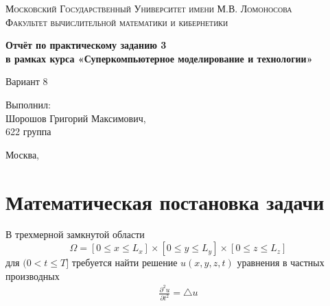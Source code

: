 \documentclass[oneside, final, 12pt]{extarticle}
\begin{document}
\normalsize

\begin{titlepage}
    \begin{center}
        \textsc{Московский Государственный Университет имени М.В. Ломоносова\\[5mm]
            Факультет вычислительной математики и кибернетики}
        \centerline{\hfill\hrulefill\hrulefill\hfill}
    \end{center}

    \vfill
    \vfill
    \vfill
    \vfill
    \begin{center}
        \Large
        \textbf{Отчёт по практическому заданию 3 \\
            в рамках курса
            «Суперкомпьютерное моделирование и технологии»}
    \end{center}

    \vfill
    \vfill
    \vfill
    \hfill
    \begin{flushright}
        Вариант 8
    \end{flushright}

    \begin{flushright}
        Выполнил: \\
        Шорошов Григорий Максимович, \\
        622 группа \\[5mm]
    \end{flushright}

    \vfill
    \vfill
    \vfill
    \begin{center}
        Москва, \the\year
    \end{center}
\end{titlepage}

\parindent=1cm

\newpage
\section{Математическая постановка задачи}

В трехмерной замкнутой области
$$
\Omega = [0 \leq x \leq L_x] \times [0 \leq y \leq L_y] \times [0 \leq z \leq L_z] 
$$
для $ (0 < t \leq T] $ требуется найти решение $ u(x, y, z, t) $ уравнения в частных производных
\begin{align}
\frac{\partial^2 u}{\partial t^2} = \bigtriangleup u \label{eqn:main}
\end{align}
\end{document}
